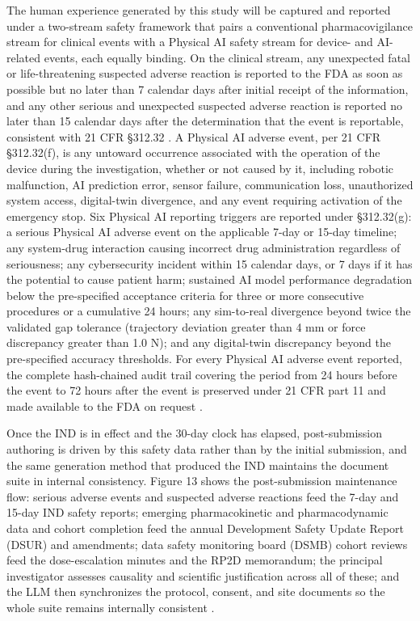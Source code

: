 The human experience generated by this study will be captured and reported under a
two-stream safety framework that pairs a conventional pharmacovigilance stream for
clinical events with a Physical AI safety stream for device- and AI-related events,
each equally binding. On the clinical stream, any unexpected fatal or
life-threatening suspected adverse reaction is reported to the FDA as soon as
possible but no later than 7 calendar days after initial receipt of the
information, and any other serious and unexpected suspected adverse reaction is
reported no later than 15 calendar days after the determination that the event is
reportable, consistent with 21 CFR \S 312.32 \cite{cfr312paiuni}. A Physical AI
adverse event, per 21 CFR \S 312.32(f), is any untoward occurrence associated with
the operation of the device during the investigation, whether or not caused by it,
including robotic malfunction, AI prediction error, sensor failure, communication
loss, unauthorized system access, digital-twin divergence, and any event requiring
activation of the emergency stop. Six Physical AI reporting triggers are reported
under \S 312.32(g): a serious Physical AI adverse event on the applicable 7-day or
15-day timeline; any system-drug interaction causing incorrect drug administration
regardless of seriousness; any cybersecurity incident within 15 calendar days, or
7 days if it has the potential to cause patient harm; sustained AI model
performance degradation below the pre-specified acceptance criteria for three or
more consecutive procedures or a cumulative 24 hours; any sim-to-real divergence
beyond twice the validated gap tolerance (trajectory deviation greater than 4 mm or
force discrepancy greater than 1.0 N); and any digital-twin discrepancy beyond the
pre-specified accuracy thresholds. For every Physical AI adverse event reported,
the complete hash-chained audit trail covering the period from 24 hours before the
event to 72 hours after the event is preserved under 21 CFR part 11 and made
available to the FDA on request \cite{cfr312paiuni, cfr050paiuni}.

Once the IND is in effect and the 30-day clock has elapsed, post-submission
authoring is driven by this safety data rather than by the initial submission, and
the same generation method that produced the IND maintains the document suite in
internal consistency. Figure 13 shows the post-submission maintenance flow:
serious adverse events and suspected adverse reactions feed the 7-day and 15-day
IND safety reports; emerging pharmacokinetic and pharmacodynamic data and cohort
completion feed the annual Development Safety Update Report (DSUR) and amendments;
data safety monitoring board (DSMB) cohort reviews feed the dose-escalation minutes
and the RP2D memorandum; the principal investigator assesses causality and
scientific justification across all of these; and the LLM then synchronizes the
protocol, consent, and site documents so the whole suite remains internally
consistent \cite{onpremwhippl, ichpaistduni}.

